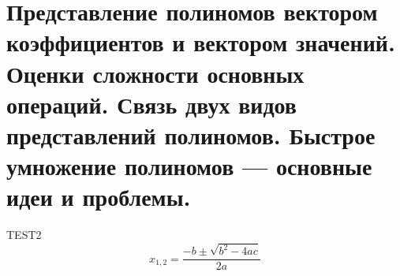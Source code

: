 \section{Представление полиномов вектором коэффициентов и вектором значений. Оценки сложности основных операций. Связь двух видов представлений полиномов. Быстрое умножение полиномов — основные идеи и проблемы.}
  TEST2
  $$x_{1,2}=\dfrac{-b\pm\sqrt{b^2-4ac}}{2a}$$